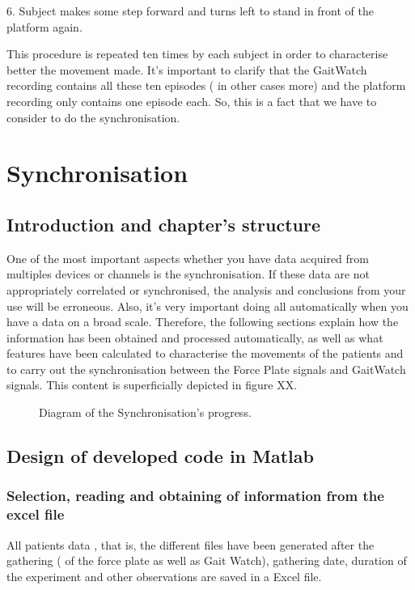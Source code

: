 6.	Subject makes some step  forward and turns left to stand in front of the platform again.

This procedure is repeated ten times by each subject in order to characterise better the movement made.
It’s important to clarify that the GaitWatch recording contains all these ten episodes ( in other cases more) and the platform recording only contains one episode each. So, this is a fact that we have to consider to do the synchronisation.

\section{Synchronisation}

\subsection{Introduction and chapter's structure}
One of the most important aspects whether you have data acquired from multiples devices or channels is the synchronisation. If these data are not appropriately correlated or synchronised, the analysis and conclusions from your use will be erroneous. Also, it’s very important doing all automatically when you have a data on a broad scale.
Therefore, the following sections explain how the information has been obtained and processed automatically, as well as what features have been calculated to characterise the movements of the patients and to carry out the synchronisation between the Force Plate signals and GaitWatch signals. This content is superficially depicted in figure XX.

\begin{figure}[H]
	\centering
	\caption{Diagram of the Synchronisation's progress.}
	\label{fig:arte1}
\end{figure}

\subsection{Design of developed code  in Matlab}
\subsubsection{Selection, reading and obtaining of information from the excel file}
All patients data , that is, the different files have been generated after the gathering (  of the force plate as well as Gait Watch), gathering date, duration of the experiment and other observations are saved in a Excel file. 

